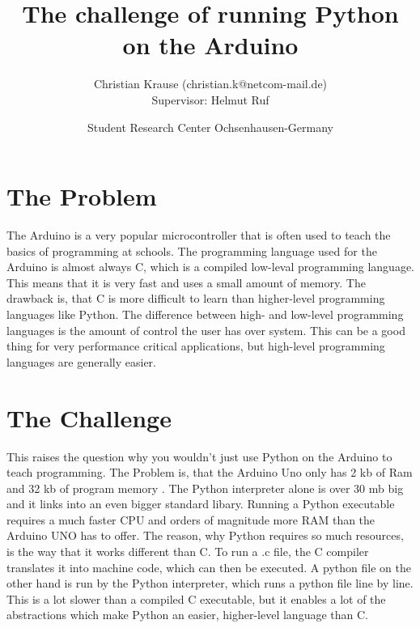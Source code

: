 \documentclass{article}
\title{The challenge of running Python on the Arduino}
\author{Christian Krause \small(christian.k@netcom-mail.de)\\[0.1cm]{\small Supervisor: Helmut Ruf}}
\date{\small Student Research Center Ochsenhausen-Germany}
\begin{document}
\maketitle
\begin{multicols}{2}
\section{The Problem}
The Arduino is a very popular microcontroller that is often used to teach the basics of programming at schools. The programming language used for the Arduino is almost always C, which is a compiled low-leval programming language. This means that it is very fast and uses a small amount of memory. The drawback is, that C is more difficult to learn than higher-level programming languages like Python. The difference between high- and low-level programming languages is the amount of control the user has over system. This can be a good thing for very performance critical applications, but high-level programming languages are generally easier.%

\section{The Challenge}
This raises the question why you wouldn't just use Python on the Arduino to teach programming. The Problem is, that the Arduino Uno only has 2 kb of Ram and 32 kb of program memory \cite{Q1}. The Python interpreter alone is over 30 mb big and it links into an even bigger standard libary. Running a Python executable requires a much faster CPU and orders of magnitude more RAM than the Arduino UNO has to offer. %
The reason, why Python requires so much resources, is the way that it works different than C. To run a .c file, the C compiler translates it into machine code, which can then be executed. A python file on the other hand is run by the Python interpreter, which runs a python file line by line. This is a lot slower than a compiled C executable, but it enables a lot of the abstractions which make Python an easier, higher-level language than C.


\end{multicols}
\end{document}
